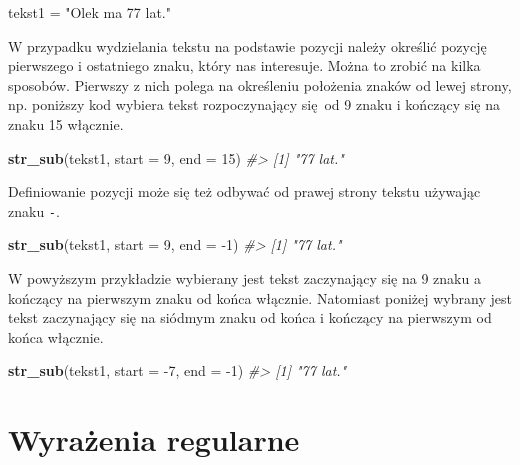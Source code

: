 \documentclass[paper=6in:9in,pagesize=pdftex,headinclude=on,footinclude=on,10pt]{scrbook}
\newenvironment{Shaded}{\begin{snugshade}}{\end{snugshade}}
\newcommand{\CommentTok}[1]{\textcolor[rgb]{0.56,0.35,0.01}{\textit{#1}}}
\newcommand{\DataTypeTok}[1]{\textcolor[rgb]{0.13,0.29,0.53}{#1}}
\newcommand{\DecValTok}[1]{\textcolor[rgb]{0.00,0.00,0.81}{#1}}
\newcommand{\KeywordTok}[1]{\textcolor[rgb]{0.13,0.29,0.53}{\textbf{#1}}}
\newcommand{\NormalTok}[1]{#1}
\newcommand{\StringTok}[1]{\textcolor[rgb]{0.31,0.60,0.02}{#1}}
\begin{document}
\begin{Shaded}
\begin{Highlighting}[]
\NormalTok{tekst1 =}\StringTok{ "Olek ma 77 lat."}
\end{Highlighting}
\end{Shaded}

W przypadku wydzielania tekstu na podstawie pozycji należy określić pozycję pierwszego i ostatniego znaku, który nas interesuje.
Można to zrobić na kilka sposobów.
Pierwszy z nich polega na określeniu położenia znaków od lewej strony, np. poniższy kod wybiera tekst rozpoczynający się~od 9 znaku i kończący się na znaku 15 włącznie.

\begin{Shaded}
\begin{Highlighting}[]
\KeywordTok{str_sub}\NormalTok{(tekst1, }\DataTypeTok{start =} \DecValTok{9}\NormalTok{, }\DataTypeTok{end =} \DecValTok{15}\NormalTok{)}
\CommentTok{#> [1] "77 lat."}
\end{Highlighting}
\end{Shaded}

Definiowanie pozycji może się też odbywać od prawej strony tekstu używając znaku \texttt{-}.

\begin{Shaded}
\begin{Highlighting}[]
\KeywordTok{str_sub}\NormalTok{(tekst1, }\DataTypeTok{start =} \DecValTok{9}\NormalTok{, }\DataTypeTok{end =} \DecValTok{-1}\NormalTok{)}
\CommentTok{#> [1] "77 lat."}
\end{Highlighting}
\end{Shaded}

W powyższym przykładzie wybierany jest tekst zaczynający się na 9 znaku a kończący na pierwszym znaku od końca włącznie.
Natomiast poniżej wybrany jest tekst zaczynający się na siódmym znaku od końca i kończący na pierwszym od końca włącznie.

\begin{Shaded}
\begin{Highlighting}[]
\KeywordTok{str_sub}\NormalTok{(tekst1, }\DataTypeTok{start =} \DecValTok{-7}\NormalTok{, }\DataTypeTok{end =} \DecValTok{-1}\NormalTok{)}
\CommentTok{#> [1] "77 lat."}
\end{Highlighting}
\end{Shaded}

\hypertarget{wyraux17cenia-regularne}{%
\section{Wyrażenia regularne}\label{wyraux17cenia-regularne}}
\end{document}

